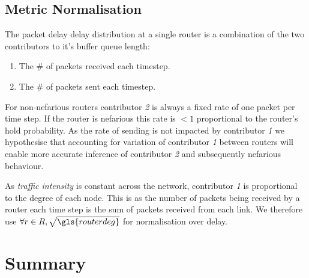 \subsection{Metric Normalisation}
\label{ssec:Mmetricnormilisation}
The packet delay delay distribution at a single router is a combination of the two contributors to it's buffer queue length:
\begin{enumerate}
    \item The \# of packets received each timestep.
    \item The \# of packets sent each timestep.
\end{enumerate}
For non-nefarious routers contributor \emph{2} is always a fixed rate of one packet per time step. If the router is nefarious this rate is $<1$ proportional to the router's hold probability. As the rate of sending is not impacted by contributor \emph{1} we hypothesise that accounting for variation of contributor \emph{1} between routers will enable more accurate inference of contributor \emph{2} and subsequently nefarious behaviour.\par
As \textit{traffic intensity} is constant across the network, contributor \emph{1} is proportional to the degree of each node. This is as the number of packets being received by a router each time step is the sum of packets received from each link. We therefore use $\forall r\in R, \sqrt{\gls{routerdeg}}$ for normalisation over delay.

\section{Summary}
